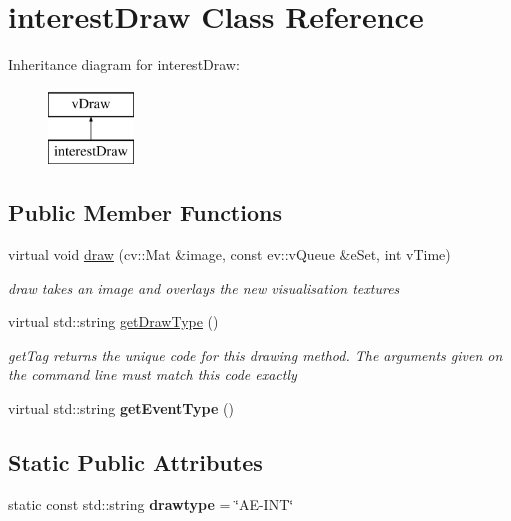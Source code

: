 \hypertarget{classinterestDraw}{}\section{interest\+Draw Class Reference}
\label{classinterestDraw}
Inheritance diagram for interest\+Draw\+:\begin{figure}[H]
\begin{center}
\leavevmode
\includegraphics[height=2.000000cm]{classinterestDraw}
\end{center}
\end{figure}
\subsection*{Public Member Functions}
\begin{DoxyCompactItemize}
\item 
virtual void \hyperlink{classinterestDraw_a0e181779fcbc9303d2f6c77e5151eca8}{draw} (cv\+::\+Mat \&image, const ev\+::v\+Queue \&e\+Set, int v\+Time)
\begin{DoxyCompactList}\small\item\em draw takes an image and overlays the new visualisation textures \end{DoxyCompactList}\item 
virtual std\+::string \hyperlink{classinterestDraw_a8121cc47bf53a6571e6afcb1afe68d86}{get\+Draw\+Type} ()
\begin{DoxyCompactList}\small\item\em get\+Tag returns the unique code for this drawing method. The arguments given on the command line must match this code exactly \end{DoxyCompactList}\item 
virtual std\+::string {\bfseries get\+Event\+Type} ()\hypertarget{classinterestDraw_a9be4fecf2899af86ca32e0eaa137ae5e}{}\label{classinterestDraw_a9be4fecf2899af86ca32e0eaa137ae5e}

\end{DoxyCompactItemize}
\subsection*{Static Public Attributes}
\begin{DoxyCompactItemize}
\item 
static const std\+::string {\bfseries drawtype} = \char`\"{}AE-\/I\+NT\char`\"{}\hypertarget{classinterestDraw_ac439839e21e0d791d83ae245194e5629}{}\label{classinterestDraw_ac439839e21e0d791d83ae245194e5629}

\end{DoxyCompactItemize}
